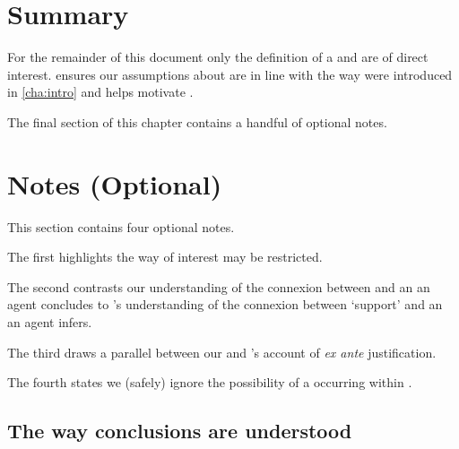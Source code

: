 \section*{Summary}


\begin{note}
  For the remainder of this document only the definition of a \wit{} and \supportII{} are of direct interest.
  \supportI{} ensures our assumptions about \fingfr{} are in line with the way  were introduced in \autoref{cha:intro} and helps motivate \supportII{}.
\end{note}


\begin{note}
  The final section of this chapter contains a handful of optional notes.
\end{note}



\section[Notes]{Notes \hfill (Optional)}


\begin{note}
  This section contains four optional notes.

  The first highlights the way  of interest may be restricted.

  The second contrasts our understanding of the connexion between  and an  an agent concludes to \citeauthor{Boghossian:2014aa}'s understanding of the connexion between `support' and an  an agent infers.

  The third draws a parallel between our \supportII{} and \citeauthor{Goldman:1979ui}'s account of \emph{ex ante} justification.

  The fourth states we (safely) ignore the possibility of a \fingfr{} occurring within \fingfr{}.
\end{note}


\subsection*{The way conclusions are understood}


